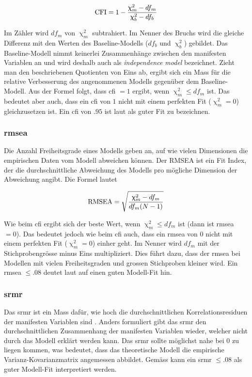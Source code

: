 \documentclass[11pt, twoside, a4paper]{book}		%
\begin{document}
$$ \textnormal{CFI} = 1 - \frac{\upchi^2_{m}-df_{m}}{\upchi^2_{b}-df_{b}} $$

\noindent Im Zähler wird $df_{m}$ von $\upchi^2_{m}$ subtrahiert. Im Nenner des Bruchs wird die gleiche Differenz mit den Werten des Baseline-Modells ($df_{b}$ und $\upchi^2_{b}$) gebildet.
Das Baseline-Modell nimmt keinerlei Zusammenhänge zwischen den manifesten Variablen an und wird deshalb auch als \textit{independence model} bezeichnet. Zieht man den beschriebenen Quotienten von Eins ab, ergibt sich ein Mass für die relative Verbesserung des angenommenen Modells gegenüber dem Baseline-Modell. Aus der Formel folgt, dass \gls{cfi} $= 1$ ergibt, wenn $\upchi^2_{m} \leq df_{m}$ ist. Das bedeutet aber auch, dass ein \gls{cfi} von $1$ nicht mit einem perfekten Fit ($\upchi^2_{m} = 0$) gleichzusetzen ist. Ein \gls{cfi} von $.95$ ist laut \citet{Hu1999} als guter Fit zu bezeichnen.

\subsubsection*{\gls{rmsea}}
Die Anzahl Freiheitsgrade eines Modells geben an, auf wie vielen Dimensionen die empirischen Daten vom Modell abweichen können. Der RMSEA \citep{Steiger1990} ist ein Fit Index, der die durchschnittliche Abweichung des Modells pro mögliche Dimension der Abweichung angibt. Die Formel lautet

$$ \textnormal{RMSEA} = \sqrt{ \frac{\upchi^2_{m}-df_{m}}{df_{m}(N-1)} } $$

\noindent Wie beim \gls{cfi} ergibt sich der beste Wert, wenn $\upchi^2_{m} \leq df_{m}$ ist (dann ist \gls{rmsea} $= 0$). Das bedeutet jedoch wie beim \gls{cfi} auch, dass ein \gls{rmsea} von $0$ nicht mit einem perfekten Fit ($\upchi^2_{m} = 0$) einher geht. Im Nenner wird $df_{m}$ mit der Stichprobengrösse minus Eins multipliziert. Dies führt dazu, dass der \gls{rmsea} bei Modellen mit vielen Freiheitsgraden und grossen Stichproben kleiner wird. Ein \gls{rmsea} $\leq.08$ deutet laut \citet{Browne1993} auf einen guten Modell-Fit hin.

\subsubsection*{\gls{srmr}}
Das \gls{srmr} ist ein Mass dafür, wie hoch die durchschnittlichen Korrelationsresiduen der manifesten Variablen sind \citep{Kline2011}. Anders formuliert gibt das \gls{srmr} den durchschnittlichen Zusammenhang der manifesten Variablen wieder, welcher nicht durch das Modell erklärt werden kann. Das \gls{srmr} sollte möglichst nahe bei $0$ zu liegen kommen, was bedeutet, dass das theoretische Modell die empirische Var\-ianz-Ko\-var\-ianz\-ma\-trix angemessen abbildet. Gemäss \citet{Hu1999} kann ein \gls{srmr} $\leq.08$ als guter Modell-Fit interpretiert werden.
\end{document}
